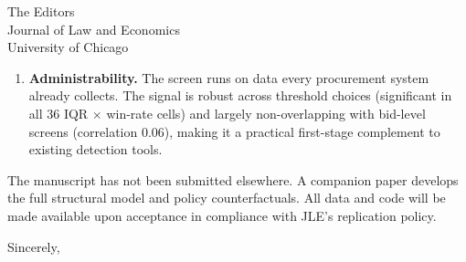 \documentclass[12pt]{letter}
\begin{document}
\begin{letter}{The Editors\\Journal of Law and Economics\\University of Chicago}
\begin{enumerate}
\item \textbf{Administrability.} The screen runs on data every procurement system already collects. The signal is robust across threshold choices (significant in all 36 IQR $\times$ win-rate cells) and largely non-overlapping with bid-level screens (correlation 0.06), making it a practical first-stage complement to existing detection tools.
\end{enumerate}

The manuscript has not been submitted elsewhere. A companion paper develops the full structural model and policy counterfactuals. All data and code will be made available upon acceptance in compliance with JLE's replication policy.

\closing{Sincerely,}

\end{letter}
\end{document}
